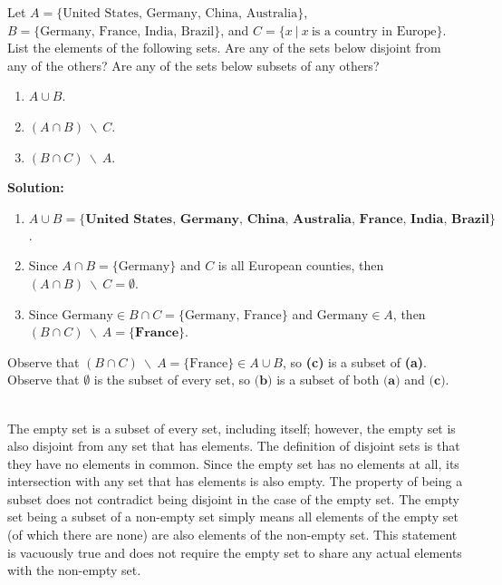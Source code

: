 Let $A = \{\text{United States, Germany, China, Australia}\}$, $B = \{\text{Germany, France, India, Brazil}\}$, and $C = \{x \: | \: x \: \text{is a country in Europe}\}$. List the elements of the following sets. Are any of the sets below disjoint from any of the others? Are any of the sets below subsets of any others?

\begin{enumerate}[label=(\alph*)]
    \item $A \cup B$.
    \item $(A \cap B) \: \backslash \: C$.
    \item $(B \cap C) \: \backslash \: A$.
\end{enumerate}

\textbf{Solution:}
\begin{enumerate}[label=(\alph*)]
\item $A \cup B = \bm{\{\text{United States, Germany, China, Australia, France, India, Brazil}\}}$.
\item Since $A \cap B = \{\text{Germany}\}$ and $C$ is all European counties, then $(A \cap B) \: \backslash \: C = \bm{\emptyset}$.
\item Since $\text{Germany} \in B \cap C = \{\text{Germany, France}\}$ and $\text{Germany} \in A$, then $(B \cap C) \: \backslash \: A = \bm{\{\text{France}\}}$. 
\end{enumerate}

Observe that $(B \cap C) \: \backslash \: A = \{\text{France}\} \in A \cup B$, so \textbf{(c)} is a subset of \textbf{(a)}.\\

Observe that $\emptyset$ is the subset of every set, so $\textbf{(b)}$ is a subset of both $\textbf{(a)}$ and $\textbf{(c)}$.\\
\

The empty set is a subset of every set, including itself; however, the empty set is also disjoint from any set that has elements. The definition of disjoint sets is that they have no elements in common. Since the empty set has no elements at all, its intersection with any set that has elements is also empty. The property of being a subset does not contradict being disjoint in the case of the empty set. The empty set being a subset of a non-empty set simply means all elements of the empty set (of which there are none) are also elements of the non-empty set. This statement is vacuously true and does not require the empty set to share any actual elements with the non-empty set.
\pagebreak  